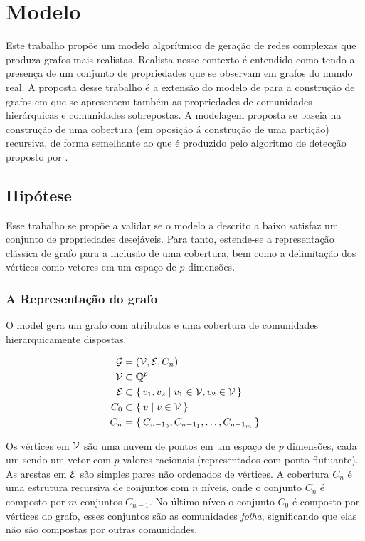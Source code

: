\documentclass[notes.tex]{subfiles}
\begin{document}
\chapter{Modelo}

Este trabalho propõe um modelo algorítmico de geração de redes complexas que produza grafos mais realistas.
Realista nesse contexto é entendido como tendo a presença de um conjunto de propriedades que se observam em grafos do mundo real.
A proposta desse trabalho é a extensão do modelo de  para a construção de grafos em que se apresentem também as propriedades de comunidades hierárquicas e comunidades sobrepostas.
A modelagem proposta se baseia na construção de uma cobertura (em oposição á construção de uma partição) recursiva, de forma semelhante ao que é produzido pelo algoritmo de detecção proposto por .


\section{Hipótese}

Esse trabalho se propõe a validar se o modelo a descrito a baixo satisfaz um conjunto de propriedades desejáveis.
Para tanto, estende-se a representação clássica de grafo para a inclusão de uma cobertura, bem como a delimitação dos vértices como vetores em um espaço de $p$ dimensões.

\subsection{A Representação do grafo}

O model gera um grafo com atributos e uma cobertura de comunidades hierarquicamente dispostas.

\begin{equation}
\begin{split}
    \operatorname{\mathcal{G}} &= (\operatorname{\mathcal{V}}, \operatorname{\mathcal{E}}, C_n) \\
    \operatorname{\mathcal{V}} &\subset  \mathbb{Q}^{p} \\
    \operatorname{\mathcal{E}} &\subset \set{v_1, v_2 | v_1 \in \operatorname{\mathcal{V}}, v_2 \in \operatorname{\mathcal{V}}} \\
     C_0 &\subset \Set{v | v \in \operatorname{\mathcal{V}}} \\
     C_n &= \Set{C_{n-1_0}, C_{n-1_1}, \ldots, C_{n-1_m}} \\
\end{split}
\end{equation}

Os vértices em $\operatorname{\mathcal{V}}$ são uma nuvem de pontos em um espaço de $p$ dimensões, cada um sendo um vetor com $p$ valores racionais (representados com ponto flutuante).
As arestas em $\operatorname{\mathcal{E}}$ são simples pares não ordenados de vértices.
A cobertura $C_n$ é uma estrutura recursiva de conjuntos com $n$ níveis, onde o conjunto $C_n$ é composto por $m$ conjuntos $C_{n-1}$.
No último níveo o conjunto $C_0$ é composto por vértices do grafo, esses conjuntos são as comunidades \emph{folha}, significando que elas não são compostas por outras comunidades.
\end{document}
